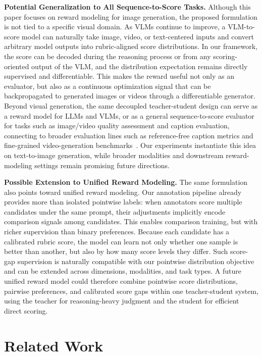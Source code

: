 \documentclass{article}
\begin{document}
\textbf{Potential Generalization to All Sequence-to-Score Tasks.}
Although this paper focuses on reward modeling for image generation, the proposed formulation is not tied to a specific visual domain. As VLMs continue to improve, a VLM-to-score model can naturally take image, video, or text-centered inputs and convert arbitrary model outputs into rubric-aligned score distributions. In our framework, the score can be decoded during the reasoning process or from any scoring-oriented output of the VLM, and the distribution expectation remains directly supervised and differentiable. This makes the reward useful not only as an evaluator, but also as a continuous optimization signal that can be backpropagated to generated images or videos through a differentiable generator. Beyond visual generation, the same decoupled teacher-student design can serve as a reward model for LLMs and VLMs, or as a general sequence-to-score evaluator for tasks such as image/video quality assessment and caption evaluation, connecting to broader evaluation lines such as reference-free caption metrics and fine-grained video-generation benchmarks~\cite{hessel2021clipscore,huang2024vbench}. Our experiments instantiate this idea on text-to-image generation, while broader modalities and downstream reward-modeling settings remain promising future directions.

\textbf{Possible Extension to Unified Reward Modeling.}
The same formulation also points toward unified reward modeling. Our annotation pipeline already provides more than isolated pointwise labels: when annotators score multiple candidates under the same prompt, their adjustments implicitly encode comparison signals among candidates. This enables comparison training, but with richer supervision than binary preferences. Because each candidate has a calibrated rubric score, the model can learn not only whether one sample is better than another, but also by how many score levels they differ. Such score-gap supervision is naturally compatible with our pointwise distribution objective and can be extended across dimensions, modalities, and task types. A future unified reward model could therefore combine pointwise score distributions, pairwise preferences, and calibrated score gaps within one teacher-student system, using the teacher for reasoning-heavy judgment and the student for efficient direct scoring.

\section{Related Work}
\end{document}
